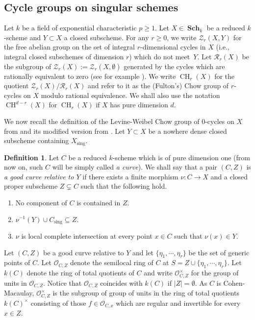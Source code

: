 \documentclass[11pt]{article}
\numberwithin{equation}{section}
\let\mathcal\mathscr
\theoremstyle{definition}
\newtheorem{defn}[thm]{Definition}
\newcommand{\sO}{{\mathcal O}}\let\cO\sO
\newcommand{\sR}{{\mathcal R}}
\newcommand{\sZ}{{\mathcal Z}}
\DeclareMathOperator{\CH}{CH}
\DeclareMathOperator{\Sch}{\mathbf{Sch}}
\newcommand{\sing}{\mathrm{sing}}
\begin{document}
\subsection{Cycle groups on singular schemes}\label{ssec:$0$-cycles-singschemes}
Let $k$ be a field of exponential characteristic $p \ge 1$. Let $X\in \Sch_k$ be a reduced $k$-scheme and $Y \subset X$ a closed subscheme. For any $r\geq 0$, we write
$\sZ_r(X,Y)$ for the free abelian group on the set of integral $r$\nobreakdash-dimen\-sional cycles in $X$ (i.e., integral closed subschemes of dimension $r$) which do not meet~$Y$.
Let $\sR_r(X)$ be the subgroup of $\sZ_r(X) := \sZ_r(X, \emptyset)$ generated by the cycles which are rationally equivalent to zero (see for example \cite[\S 1]{Fulton}). We write $\CH_r(X)$ for the quotient $\sZ_r(X)/\sR_r(X)$ and refer to it as the (Fulton's) Chow group of $r$-cycles on $X$ modulo rational equivalence.
We shall also use the notation $\CH^{d-r}(X)$ for $\CH_r(X)$ if $X$ has pure
dimension $d$.

We now recall the definition of the Levine-Weibel Chow group of $0$-cycles on $X$ from
\cite{LW} and its modified version from \cite{BK}.
Let $Y \subset X$ be a nowhere dense closed subscheme containing $X_\sing$.

\begin{defn}\label{defn:$0$-cycle-S-1}
Let $C$ be a reduced $k$-scheme which is of pure dimension one (from now on, such $C$ will be simply called \emph{a curve}).
We shall say that a pair $(C, Z)$ is \emph{a good curve
relative to $Y$} if there exists a finite morphism $\nu\colon C \to X$
and a closed proper subscheme $Z \subsetneq C$ such that the following hold.
\begin{enumerate}
\item
No component of $C$ is contained in $Z$.
\item
$\nu^{-1}(Y) \cup C_{\sing}\subseteq Z$.
\item
$\nu$ is local complete intersection at every
point $x \in C$ such that $\nu(x) \in Y$.
\end{enumerate}
\end{defn}

Let $(C, Z)$ be a good curve relative to $Y$ and let
$\{\eta_1, \cdots , \eta_r\}$ be the set of generic points of $C$.
Let $\sO_{C,Z}$ denote the semilocal ring of $C$ at
$S = Z \cup \{\eta_1, \cdots , \eta_r\}$.
Let $k(C)$ denote the ring of total
quotients of $C$ and write $\sO_{C,Z}^\times$ for the group of units in
$\sO_{C,Z}$. Notice that $\sO_{C,Z}$ coincides with $k(C)$
if $|Z| = \emptyset$.
As $C$ is Cohen-Macaulay, $\sO_{C,Z}^\times$ is the subgroup of group of units
in the ring of total quotients $k(C)^\times$
consisting of those $f\in \sO_{C,x}$ which are regular and invertible for
every $x\in Z$.
\end{document}
